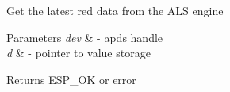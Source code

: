 \begin{DoxyItemize}
\item Get the latest red data from the A\+LS engine 
\end{DoxyItemize}


\begin{DoxyParams}{Parameters}
{\em dev} & -\/ apds handle \\
\hline
{\em d} & -\/ pointer to value storage \\
\hline
\end{DoxyParams}
\begin{DoxyReturn}{Returns}
E\+S\+P\+\_\+\+OK or error 
\end{DoxyReturn}
